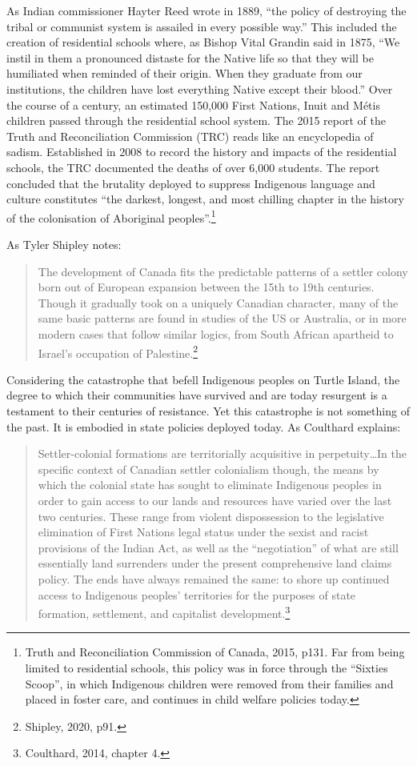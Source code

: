 As Indian commissioner Hayter Reed wrote in 1889, ``the policy of destroying the tribal or communist system is assailed in every possible way.'' This included the creation of residential schools where, as Bishop Vital Grandin said in 1875, ``We instil in them a pronounced distaste for the Native life so that they will be humiliated when reminded of their origin. When they graduate from our institutions, the children have lost everything Native except their blood.'' Over the course of a century, an estimated 150,000 First Nations, Inuit and M\'{e}tis children passed through the residential school system. The 2015 report of the Truth and Reconciliation Commission (TRC) reads like an encyclopedia of sadism. Established in 2008 to record the history and impacts of the residential schools, the TRC documented the deaths of over 6,000 students. The report concluded that the brutality deployed to suppress Indigenous language and culture constitutes ``the darkest, longest, and most chilling chapter in the history of the colonisation of Aboriginal peoples''.\footnote{Truth and Reconciliation Commission of Canada, 2015, p131. Far from being limited to residential schools, this policy was in force through the ``Sixties Scoop'', in which Indigenous children were removed from their families and placed in foster care, and continues in child welfare policies today.}

As Tyler Shipley notes:

\blockquote{The development of Canada fits the predictable patterns of a settler colony born out of European expansion between the 15th to 19th centuries. Though it gradually took on a uniquely Canadian character, many of the same basic patterns are found in studies of the US or Australia, or in more modern cases that follow similar logics, from South African apartheid to Israel's occupation of Palestine.\footnote{Shipley, 2020, p91.}}

Considering the catastrophe that befell Indigenous peoples on Turtle Island, the degree to which their communities have survived and are today resurgent is a testament to their centuries of resistance. Yet this catastrophe is not something of the past. It is embodied in state policies deployed today. As Coulthard explains:

\blockquote{Settler-colonial formations are territorially acquisitive in perpetuity\ldots In the specific context of Canadian settler colonialism though, the means by which the colonial state has sought to eliminate Indigenous peoples in order to gain access to our lands and resources have varied over the last two centuries. These range from violent dispossession to the legislative elimination of First Nations legal status under the sexist and racist provisions of the Indian Act, as well as the ``negotiation'' of what are still essentially land surrenders under the present comprehensive land claims policy. The ends have always remained the same: to shore up continued access to Indigenous peoples' territories for the purposes of state formation, settlement, and capitalist development.\footnote{Coulthard, 2014, chapter 4.}}

